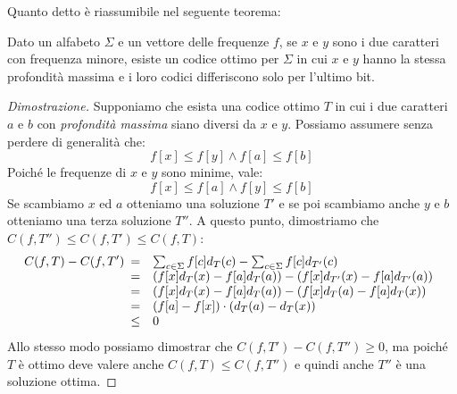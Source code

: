 Quanto detto è riassumibile nel seguente teorema:
\begin{definition}
    Dato un alfabeto $\Sigma$ e un vettore delle frequenze $f$, se $x$ e $y$
    sono i due caratteri con frequenza minore, esiste un codice ottimo per
    $\Sigma$ in cui $x$ e $y$ hanno la stessa profondità massima e i loro codici
    differiscono solo per l'ultimo bit.
\end{definition}
\begin{proof}[Dimostrazione]
    Supponiamo che esista una codice ottimo $T$ in cui i due caratteri $a$ e $b$
    con \emph{profondità massima} siano diversi da $x$ e $y$. Possiamo assumere
    senza perdere di generalità che:
    \[f[x]\leq f[y]\wedge f[a]\leq f[b]\]
    Poiché le frequenze di $x$ e $y$ sono minime, vale:
    \[f[x]\leq f[a]\wedge f[y]\leq f[b]\]
    Se scambiamo $x$ ed $a$ otteniamo una soluzione $T'$ e se poi scambiamo
    anche $y$ e $b$ otteniamo una terza soluzione $T''$. A questo punto,
    dimostriamo che $C(f,T'')\leq C(f,T')\leq C(f,T)$:
    \[C(f,T)-C(f,T')\begin{array}[t]{cl}
        = & \sum_{c\in\Sigma} f[c]d_T(c)-\sum_{c\in\Sigma}f[c]d_{T'}(c)\\
        = & \left(f[x]d_T(x)-f[a]d_{T}(a)\right)-\left(f[x]d_{T'}(x)-
        f[a]d_{T'}(a)\right)\\
        = & \left(f[x]d_T(x)-f[a]d_{T}(a)\right)-\left(f[x]d_{T}(a)-
        f[a]d_{T}(x)\right)\\
        = & \left(f[a]-f[x]\right)\cdot\left(d_T(a)-d_T(x)\right)\\
        \leq & 0
    \end{array}\]
    Allo stesso modo possiamo dimostrar che $C(f,T')-C(f,T'')\geq 0$, ma
    poiché $T$ è ottimo deve valere anche $C(f,T)\leq C(f,T'')$ e quindi anche
    $T''$ è una soluzione ottima.
\end{proof}